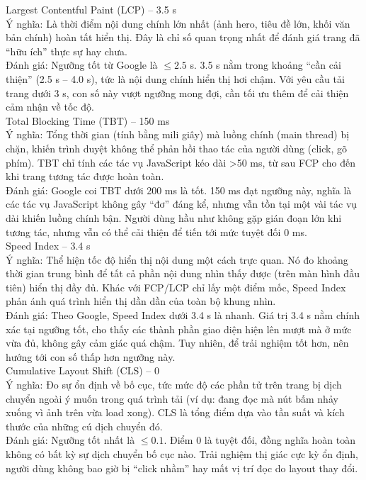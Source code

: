 Largest Contentful Paint (LCP) – 3.5 s \\
Ý nghĩa: Là thời điểm nội dung chính lớn nhất (ảnh hero, tiêu đề lớn, khối văn bản chính) hoàn tất hiển thị. Đây là chỉ số quan trọng nhất để đánh giá trang đã “hữu ích” thực sự hay chưa. \\
Đánh giá: Ngưỡng tốt từ Google là $\leq 2.5$ s. 3.5 s nằm trong khoảng “cần cải thiện” (2.5 s – 4.0 s), tức là nội dung chính hiển thị hơi chậm. Với yêu cầu tải trang dưới 3 s, con số này vượt ngưỡng mong đợi, cần tối ưu thêm để cải thiện cảm nhận về tốc độ. \\

Total Blocking Time (TBT) – 150 ms \\
Ý nghĩa: Tổng thời gian (tính bằng mili giây) mà luồng chính (main thread) bị chặn, khiến trình duyệt không thể phản hồi thao tác của người dùng (click, gõ phím). TBT chỉ tính các tác vụ JavaScript kéo dài >50 ms, từ sau FCP cho đến khi trang tương tác được hoàn toàn. \\
Đánh giá: Google coi TBT dưới 200 ms là tốt. 150 ms đạt ngưỡng này, nghĩa là các tác vụ JavaScript không gây “đơ” đáng kể, nhưng vẫn tồn tại một vài tác vụ dài khiến luồng chính bận. Người dùng hầu như không gặp gián đoạn lớn khi tương tác, nhưng vẫn có thể cải thiện để tiến tới mức tuyệt đối 0 ms. \\

Speed Index – 3.4 s \\
Ý nghĩa: Thể hiện tốc độ hiển thị nội dung một cách trực quan. Nó đo khoảng thời gian trung bình để tất cả phần nội dung nhìn thấy được (trên màn hình đầu tiên) hiển thị đầy đủ. Khác với FCP/LCP chỉ lấy một điểm mốc, Speed Index phản ánh quá trình hiển thị dần dần của toàn bộ khung nhìn. \\
Đánh giá: Theo Google, Speed Index dưới 3.4 s là nhanh. Giá trị 3.4 s nằm chính xác tại ngưỡng tốt, cho thấy các thành phần giao diện hiện lên mượt mà ở mức vừa đủ, không gây cảm giác quá chậm. Tuy nhiên, để trải nghiệm tốt hơn, nên hướng tới con số thấp hơn ngưỡng này. \\

Cumulative Layout Shift (CLS) – 0 \\
Ý nghĩa: Đo sự ổn định về bố cục, tức mức độ các phần tử trên trang bị dịch chuyển ngoài ý muốn trong quá trình tải (ví dụ: đang đọc mà nút bấm nhảy xuống vì ảnh trên vừa load xong). CLS là tổng điểm dựa vào tần suất và kích thước của những cú dịch chuyển đó. \\
Đánh giá: Ngưỡng tốt nhất là $\leq 0.1$. Điểm 0 là tuyệt đối, đồng nghĩa hoàn toàn không có bất kỳ sự dịch chuyển bố cục nào. Trải nghiệm thị giác cực kỳ ổn định, người dùng không bao giờ bị “click nhầm” hay mất vị trí đọc do layout thay đổi. \\


